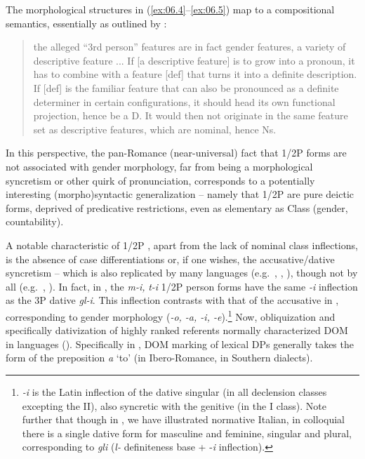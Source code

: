 \documentclass[output=paper]{langsci/langscibook}
\begin{document}
The morphological structures in (\ref{ex:06.4}--\ref{ex:06.5}) map to a
compositional semantics, essentially as outlined by \citet[221]{Kratzer2009}:

\begin{quote}
the alleged “3rd person” features are in fact gender features, a variety of
descriptive feature ... If [a descriptive feature] is to grow into a pronoun,
it has to combine with a feature [def] that turns it into a definite
description. If [def] is the familiar feature that can also be pronounced as a
definite determiner in certain configurations, it should head its own
functional projection, hence be a D. It would then not originate in the same
feature set as descriptive features, which are nominal, hence Ns.
\end{quote}

\noindent In this
perspective, the pan-Romance (near-universal) fact that 1/2P forms are not
associated with gender morphology, far from being a morphological syncretism or
other quirk of pronunciation, corresponds to a potentially interesting
\mbox{(morpho)}syntactic generalization – namely that 1/2P are pure deictic forms,
deprived of predicative restrictions, even as elementary as Class (gender,
countability).

A notable characteristic of  1/2P , apart from the lack of
nominal class inflections, is the absence of case differentiations or, if one
wishes, the accusative/dative syncretism – which is also replicated by many
languages (e.g.\ , , ), though not by all (e.g.\ ,
). In fact, in  , the \emph{m-i,} \emph{t-i} 1/2P
person forms have the same \emph{-i} inflection as the 3P dative \emph{gl-i}.
This inflection contrasts with that of the accusative in ,
corresponding to gender morphology (\emph{-o, -a, -i, -e}).\footnote{\emph{-i}
    is the Latin inflection of the dative singular (in all declension classes
    excepting the II), also syncretic with the genitive (in the I class).  Note
    further that though in , we have illustrated normative
Italian, in colloquial  there is a single dative form for masculine and
feminine, singular and plural, corresponding to \emph{gli} (\emph{l-}
definiteness base + -\emph{i} inflection).} Now, obliquization and specifically
dativization of highly ranked referents normally characterized \gls{DOM} in
 languages (\citealt{ManFra2016}).  Specifically in ,
\gls{DOM} marking of lexical DPs generally takes the form of the preposition
\emph{a} ‘to’ (in Ibero-Romance, in Southern 
dialects).
\end{document}
